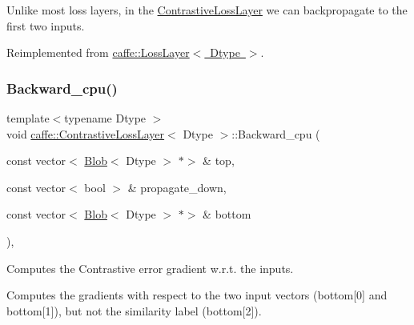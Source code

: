 Unlike most loss layers, in the \mbox{\hyperlink{classcaffe_1_1_contrastive_loss_layer}{Contrastive\+Loss\+Layer}} we can backpropagate to the first two inputs. 

Reimplemented from \mbox{\hyperlink{classcaffe_1_1_loss_layer_a36d35155bfe0de53a79c517f33759612}{caffe\+::\+Loss\+Layer$<$ Dtype $>$}}.

\mbox{\label{classcaffe_1_1_contrastive_loss_layer_a60af9729fe340be3ae0f87737215d9d0}} 
\subsubsection{\texorpdfstring{Backward\+\_\+cpu()}{Backward\_cpu()}\hspace{0.1cm}{\footnotesize\ttfamily [1/2]}}
{\footnotesize\ttfamily template$<$typename Dtype $>$ \\
void \mbox{\hyperlink{classcaffe_1_1_contrastive_loss_layer}{caffe\+::\+Contrastive\+Loss\+Layer}}$<$ Dtype $>$\+::Backward\+\_\+cpu (\begin{DoxyParamCaption}\item[{const vector$<$ \mbox{\hyperlink{classcaffe_1_1_blob}{Blob}}$<$ Dtype $>$ $\ast$$>$ \&}]{top,  }\item[{const vector$<$ bool $>$ \&}]{propagate\+\_\+down,  }\item[{const vector$<$ \mbox{\hyperlink{classcaffe_1_1_blob}{Blob}}$<$ Dtype $>$ $\ast$$>$ \&}]{bottom }\end{DoxyParamCaption})\hspace{0.3cm}{\ttfamily [protected]}, {\ttfamily [virtual]}}



Computes the Contrastive error gradient w.\+r.\+t. the inputs. 

Computes the gradients with respect to the two input vectors (bottom\mbox{[}0\mbox{]} and bottom\mbox{[}1\mbox{]}), but not the similarity label (bottom\mbox{[}2\mbox{]}).


